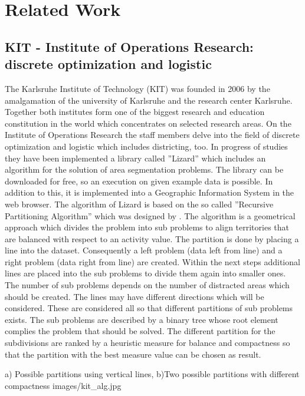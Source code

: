 \section{Related Work}

\subsection{KIT - Institute of Operations Research: discrete optimization and logistic}\label{KIT}

The Karlsruhe Institute of Technology (KIT) was founded in 2006 by the amalgamation of the university of Karlsruhe and the research center Karlsruhe. Together both institutes form one of the biggest research and education constitution in the world which concentrates on selected research areas. On the Institute of Operations Research the staff members delve into the field of discrete optimization and logistic which includes districting, too. In progress of studies they have been implemented a library called ''Lizard'' which includes an algorithm for the solution of area segmentation problems. The library can be downloaded for free, so an execution on given example data is possible. In addition to this, it is implemented into a Geographic Information System in the web browser. The algorithm of Lizard is based on the so called ''Recursive Partitioning Algorithm'' which was designed by \citeauthor{kalcsics} \cite{kalcsics}. The algorithm is a geometrical approach which divides the problem into sub problems to align territories that are balanced with respect to an activity value. The partition is done by placing a line into the dataset. Consequently a left problem (data left from line) and a right problem (data right from line) are created. Within the next steps additional lines are placed into the sub problems to divide them again into smaller ones. The number of sub problems depends on the number of distracted areas which should be created. The lines may have different directions which will be considered. These are considered all so that different partitions of sub problems exists. The sub problems are described by a binary tree whose root element complies the problem that should be solved. The different partition for the subdivisions are ranked by a heuristic measure for balance and compactness so that the partition with the best measure value can be chosen as result.

\begin{figureOwn}{a) Possible partitions using vertical lines, b)Two possible partitions with different compactness \cite{kalcsics}}{images/kit_alg.jpg}\end{figureOwn}


